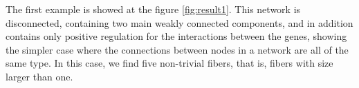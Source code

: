 \documentclass[12pt]{diazessay} %
\begin{document}
The first example is showed at the figure \ref{fig:result1}. This network is disconnected, containing two main weakly connected components, and in addition contains only positive regulation for the interactions between the genes, showing the simpler case where the connections between nodes in a network are all of the same type. In this case, we find five non-trivial fibers, that is, fibers with size larger than one.

\begin{figure}[h]
	\centering
	\qquad

\end{figure}
\end{document}
